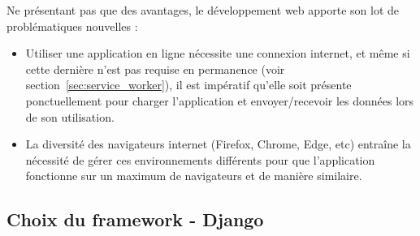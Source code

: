 \documentclass{EPL-master-thesis-covers-FR}
\begin{document}
				Ne présentant pas que des avantages, le développement web apporte son lot de problématiques nouvelles :
				\begin{itemize}
					\item Utiliser une application en ligne nécessite une connexion internet, et même si cette dernière n'est pas requise en permanence (voir section~\ref{sec:service_worker}), il est impératif qu'elle soit présente ponctuellement pour charger l'application et envoyer/recevoir les données lors de son utilisation.
					\item La diversité des navigateurs internet (Firefox, Chrome, Edge, etc) entraîne la nécessité de gérer ces environnements différents pour que l'application fonctionne sur un maximum de navigateurs et de manière similaire.
				\end{itemize}

			\subsection*{Choix du framework - Django}
\end{document}
